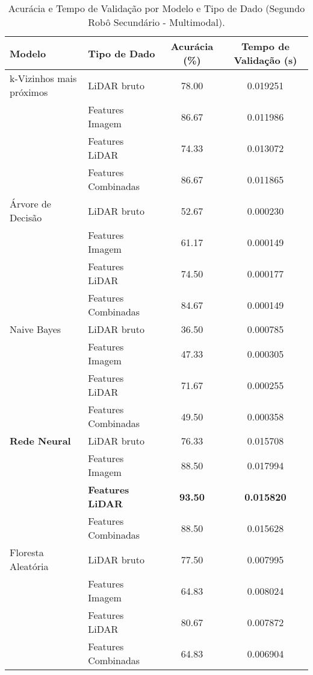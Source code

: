 \begin{table}[!ht]
\caption{Acurácia e Tempo de Validação por Modelo e Tipo de Dado (Segundo Robô Secundário - Multimodal).}
\centering
\begin{tabular}{llcc}
\hline
\textbf{Modelo} & \textbf{Tipo de Dado} & \textbf{Acurácia (\%)} & \textbf{Tempo de Validação (s)} \\
\hline
k-Vizinhos mais próximos & LiDAR bruto & 78.00 & 0.019251 \\
                         & Features Imagem & 86.67 & 0.011986 \\
                         & Features LiDAR & 74.33 & 0.013072 \\
                         & Features Combinadas & 86.67 & 0.011865 \\
\hline
Árvore de Decisão        & LiDAR bruto & 52.67 & 0.000230 \\
                         & Features Imagem & 61.17 & 0.000149 \\
                         & Features LiDAR & 74.50 & 0.000177 \\
                         & Features Combinadas & 84.67 & 0.000149 \\
\hline
Naive Bayes              & LiDAR bruto & 36.50 & 0.000785 \\
                         & Features Imagem & 47.33 & 0.000305 \\
                         & Features LiDAR & 71.67 & 0.000255 \\
                         & Features Combinadas & 49.50 & 0.000358 \\
\hline
\textbf{Rede Neural}              & LiDAR bruto & 76.33 & 0.015708 \\
                         & Features Imagem & 88.50 & 0.017994 \\
                         & \textbf{Features LiDAR} & \textbf{93.50} & \textbf{0.015820} \\
                         & Features Combinadas & 88.50 & 0.015628 \\
\hline
Floresta Aleatória       & LiDAR bruto & 77.50 & 0.007995 \\
                         & Features Imagem & 64.83 & 0.008024 \\
                         & Features LiDAR & 80.67 & 0.007872 \\
                         & Features Combinadas & 64.83 & 0.006904 \\
\hline
\end{tabular}
\label{tab:resumo_robo2_secundario_tipodado}
\end{table}

